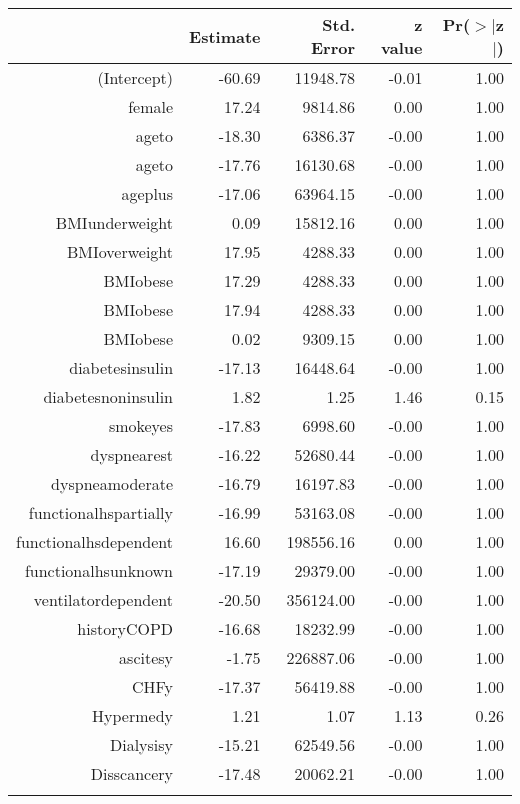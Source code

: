 \bigskip\bigskip
\centering
\begin{tabular}{rrrrr}
  \hline
 & Estimate & Std. Error & z value & Pr($>$$|$z$|$) \\ 
  \hline
(Intercept) & -60.69 & 11948.78 & -0.01 & 1.00 \\ 
  female & 17.24 & 9814.86 & 0.00 & 1.00 \\ 
  age\-65\-to\-74 & -18.30 & 6386.37 & -0.00 & 1.00 \\ 
  age\-75\-to\-84 & -17.76 & 16130.68 & -0.00 & 1.00 \\ 
  age\-85\-plus & -17.06 & 63964.15 & -0.00 & 1.00 \\ 
  BMI\-underweight & 0.09 & 15812.16 & 0.00 & 1.00 \\ 
  BMI\-overweight & 17.95 & 4288.33 & 0.00 & 1.00 \\ 
  BMI\-obese\-1 & 17.29 & 4288.33 & 0.00 & 1.00 \\ 
  BMI\-obese\-2 & 17.94 & 4288.33 & 0.00 & 1.00 \\ 
  BMI\-obese\-3 & 0.02 & 9309.15 & 0.00 & 1.00 \\ 
  diabetes\-insulin & -17.13 & 16448.64 & -0.00 & 1.00 \\ 
  diabetes\-noninsulin & 1.82 & 1.25 & 1.46 & 0.15 \\ 
  smoke\-yes & -17.83 & 6998.60 & -0.00 & 1.00 \\ 
  dyspnea\-rest & -16.22 & 52680.44 & -0.00 & 1.00 \\ 
  dyspnea\-moderate & -16.79 & 16197.83 & -0.00 & 1.00 \\ 
  functional\-hs\-partially & -16.99 & 53163.08 & -0.00 & 1.00 \\ 
  functional\-hs\-dependent & 16.60 & 198556.16 & 0.00 & 1.00 \\ 
  functional\-hs\-unknown & -17.19 & 29379.00 & -0.00 & 1.00 \\ 
  ventilator\-dependent & -20.50 & 356124.00 & -0.00 & 1.00 \\ 
  history\-COPD & -16.68 & 18232.99 & -0.00 & 1.00 \\ 
  ascites\-y & -1.75 & 226887.06 & -0.00 & 1.00 \\ 
  CHF\-y & -17.37 & 56419.88 & -0.00 & 1.00 \\ 
  Hyper\-med\-y & 1.21 & 1.07 & 1.13 & 0.26 \\ 
  Dialysis\-y & -15.21 & 62549.56 & -0.00 & 1.00 \\ 
  Diss\-cancer\-y & -17.48 & 20062.21 & -0.00 & 1.00 \\ 
$$
\end{tabular}

